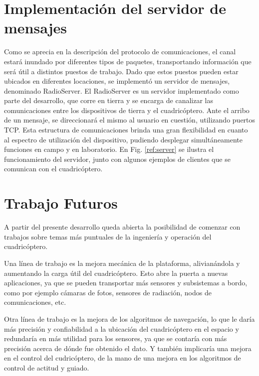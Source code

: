 \documentclass[a4paper, conference]{IEEEtran}
\begin{document}
\vspace{5 mm}

\section{Implementación del servidor de mensajes}
Como se aprecia en la descripción del protocolo de comunicaciones, el canal estará inundado por diferentes tipos de paquetes, transportando información que será útil a distintos puestos de trabajo. Dado que estos puestos pueden estar ubicados en diferentes locaciones, se implementó un servidor de mensajes, denominado RadioServer. El RadioServer es un servidor implementado como parte del desarrollo, que corre en tierra y se encarga de canalizar las comunicaciones entre los dispositivos de tierra y el cuadricóptero. Ante el arribo de un mensaje, se direccionará el mismo al usuario en cuestión, utilizando puertos TCP. Esta estructura de comunicaciones brinda una gran flexibilidad en cuanto al espectro de utilización del dispositivo, pudiendo desplegar simultáneamente funciones en campo y en laboratorio.
En Fig. \ref{ref:server} se ilustra el funcionamiento del servidor, junto con algunos ejemplos de clientes que se comunican con el cuadricóptero.

\vspace{5 mm}

\section{Trabajo Futuros}

A partir del presente desarrollo queda abierta la posibilidad de comenzar con trabajos sobre temas más puntuales de la ingeniería y operación del cuadricóptero. 

Una línea de trabajo es la mejora mecánica de la plataforma, alivianándola y aumentando la carga útil del cuadricóptero. Esto abre la puerta a nuevas aplicaciones, ya que se pueden transportar más sensores y subsistemas a bordo, como por ejemplo cámaras de fotos, sensores de radiación, nodos de comunicaciones, etc.

Otra línea de trabajo es la mejora de los algoritmos de navegación, lo que le daría más precisión y confiabilidad a la ubicación del cuadricóptero en el espacio y redundaría en más utilidad para los sensores, ya que se contaría con más precisión acerca de dónde fue obtenido el dato. Y también implicaría una mejora en el control del cudricóptero, de la mano de una mejora en los algoritmos de control de actitud y guiado.
\end{document}
